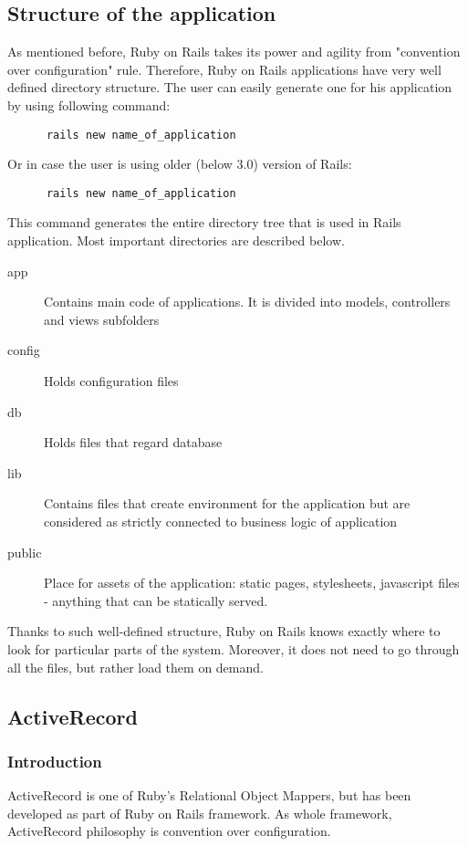     \subsection{Structure of the application}
    As mentioned before, Ruby on Rails takes its power and agility from "convention over configuration" rule. Therefore, Ruby on Rails applications have very well defined directory structure. The user can easily generate one for his application by using following command:
    \begin{lstlisting}
      rails new name_of_application
    \end{lstlisting}
    
    Or in case the user is using older (below 3.0) version of Rails:
    
    \begin{lstlisting}
      rails new name_of_application
    \end{lstlisting}
    
    This command generates the entire directory tree that is used in Rails application. Most important directories are described below.
    
    \begin{description}
      \item[app] Contains main code of applications. It is divided into models, controllers and views subfolders
      \item[config] Holds configuration files
      \item[db] Holds files that regard database
      \item[lib] Contains files that create environment for the application but are considered as strictly connected to business logic of application
      \item[public] Place for assets of the application: static pages, stylesheets, javascript files - anything that can be statically served.
    \end{description}
    
    Thanks to such well-defined structure, Ruby on Rails knows exactly where to look for particular parts of the system. Moreover, it does not need to go through all the files, but rather load them on demand.

    \subsection{ActiveRecord}
      \subsubsection{Introduction}    
      ActiveRecord is one of Ruby's Relational Object Mappers, but has been developed as
      part of Ruby on Rails framework. As whole framework, ActiveRecord philosophy is convention
      over configuration. 

